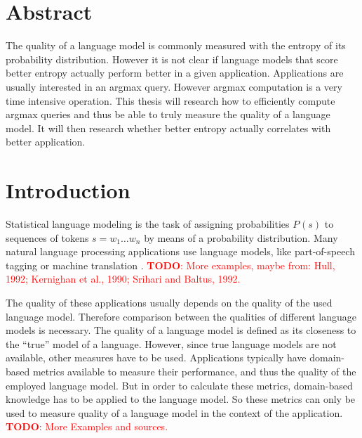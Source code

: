 \documentclass[11pt,a4paper]{article}
\title{\mytitle}
\author{\Large{\myname} \\ \mylocation \\ \texttt{\mymail}}
\date{\today}
\newcommand{\probSymbol}[1][]{P_{#1}}
\newcommand{\prob}[2][]{\probSymbol[#1](#2)}
\newcommand{\todo}[1]{\textcolor{red}{\textbf{TODO}: #1}}
\begin{document}
\maketitle

\section*{Abstract}

The quality of a language model is commonly measured with the entropy of its
probability distribution.
However it is not clear if language models that score better entropy actually
perform better in a given application.
Applications are usually interested in an argmax query.
However argmax computation is a very time intensive operation.
This thesis will research how to efficiently compute argmax queries and
thus be able to truly measure the quality of a language model.
It will then research whether better entropy actually correlates with better
application.

\section{Introduction}

Statistical language modeling is the task of assigning probabilities $\prob{s}$
to sequences of tokens ${s = w_1 \ldots w_n}$ by means of a
probability distribution.
Many natural language processing applications use language models, like
part-of-speech tagging or machine translation \parencite{Church1988,Brown1990}.
\todo{More examples, maybe from: Hull, 1992; Kernighan et al., 1990;
Srihari and Baltus, 1992.}

The quality of these applications usually depends on the quality of the used
language model.
Therefore comparison between the qualities of different language models is
necessary.
The quality of a language model is defined as its closeness to the ``true''
model of a language.
However, since true language models are not available, other measures have to be
used.
Applications typically have domain-based metrics available to measure their
performance, and thus the quality of the employed language model.
But in order to calculate these metrics, domain-based knowledge has to be
applied to the language model.
So these metrics can only be used to measure quality of a language model in the
context of the application.
\todo{More Examples and sources.}
\end{document}

